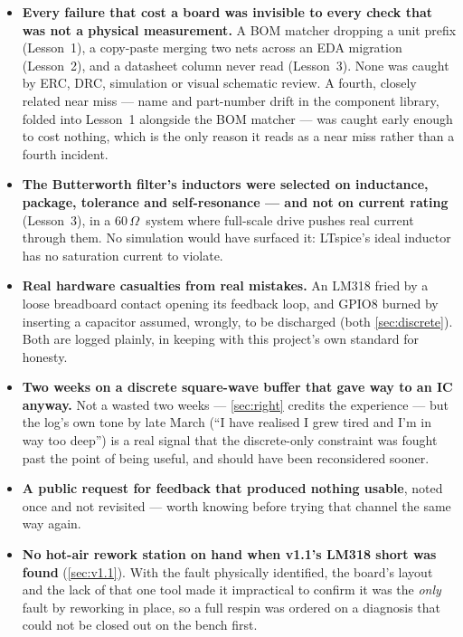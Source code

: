 \documentclass[11pt,a4paper]{article}
\newcommand{\ohm}{\ensuremath{\Omega}}
\begin{document}
\begin{itemize}
    \item \textbf{Every failure that cost a board was invisible to every check that was not
              a physical measurement.} A BOM matcher dropping a unit prefix (Lesson~1), a
          copy-paste merging two nets across an EDA migration (Lesson~2), and a datasheet column
          never read (Lesson~3). None was caught by ERC, DRC, simulation or visual schematic
          review. A fourth, closely related near miss --- name and part-number drift in the
          component library, folded into Lesson~1 alongside the BOM matcher --- was caught early
          enough to cost nothing, which is the only reason it reads as a near miss rather than a
          fourth incident.
    \item \textbf{The Butterworth filter's inductors were selected on inductance, package,
              tolerance and self-resonance --- and not on current rating} (Lesson~3), in a
          60\,\ohm\ system where full-scale drive pushes real current through them. No simulation
          would have surfaced it: LTspice's ideal inductor has no saturation current to violate.
    \item \textbf{Real hardware casualties from real mistakes.} An LM318 fried by a loose
          breadboard contact opening its feedback loop, and GPIO8 burned by inserting a capacitor
          assumed, wrongly, to be discharged (both \cref{sec:discrete}). Both are logged plainly,
          in keeping with this project's own standard for honesty.
    \item \textbf{Two weeks on a discrete square-wave buffer that gave way to an IC anyway.}
          Not a wasted two weeks --- \cref{sec:right} credits the experience --- but the log's own
          tone by late March (``I have realised I grew tired and I'm in way too deep'') is a real
          signal that the discrete-only constraint was fought past the point of being useful, and
          should have been reconsidered sooner.
    \item \textbf{A public request for feedback that produced nothing usable}, noted once
          and not revisited --- worth knowing before trying that channel the same way again.
    \item \textbf{No hot-air rework station on hand when v1.1's LM318 short was found}
          (\cref{sec:v1.1}). With the fault physically identified, the board's layout and the lack
          of that one tool made it impractical to confirm it was the \emph{only} fault by
          reworking in place, so a full respin was ordered on a diagnosis that could not be closed
          out on the bench first.
\end{itemize}
\end{document}
